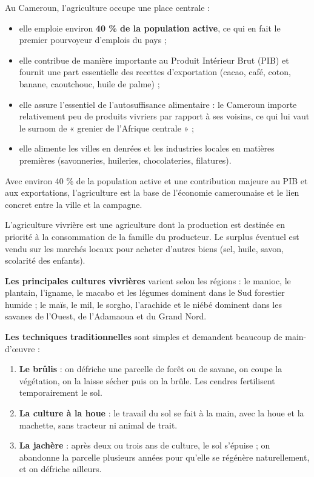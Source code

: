 \documentclass[11pt]{article}
\newcommand{\cle}[1]{{\popxbold\color{popdark}#1}}
\newcounter{popsec}
\newcounter{popsub}
\newcommand{\courssub}[1]{%
  \stepcounter{popsub}%
  \par\vspace{9pt}\noindent{\popxbold\fontsize{11.5}{13}\selectfont\color{popink}{\color{poporange}\thepopsec.\thepopsub}\hspace{6pt}#1}\par\nopagebreak\vspace{4pt}
}
\begin{document}
Au Cameroun, l'agriculture occupe une place centrale :

\begin{itemize}
\item elle emploie environ \textbf{40 \% de la population active}, ce qui en fait le premier pourvoyeur d'emplois du pays ;
\item elle contribue de manière importante au \cle{Produit Intérieur Brut} (PIB) et fournit une part essentielle des recettes d'exportation (cacao, café, coton, banane, caoutchouc, huile de palme) ;
\item elle assure l'essentiel de l'\cle{autosuffisance alimentaire} : le Cameroun importe relativement peu de produits vivriers par rapport à ses voisins, ce qui lui vaut le surnom de « grenier de l'Afrique centrale » ;
\item elle alimente les villes en denrées et les industries locales en matières premières (savonneries, huileries, chocolateries, filatures).
\end{itemize}

\begin{aretenir}
Avec environ 40 \% de la population active et une contribution majeure au PIB et aux exportations, l'agriculture est la base de l'économie camerounaise et le lien concret entre la ville et la campagne.
\end{aretenir}

\courssub{L'agriculture vivrière traditionnelle}

\begin{definition}
L'\cle{agriculture vivrière} est une agriculture dont la production est destinée en priorité à la consommation de la famille du producteur. Le surplus éventuel est vendu sur les marchés locaux pour acheter d'autres biens (sel, huile, savon, scolarité des enfants).
\end{definition}

\textbf{Les principales cultures vivrières} varient selon les régions : le \cle{manioc}, le \cle{plantain}, l'\cle{igname}, le \cle{macabo} et les légumes dominent dans le Sud forestier humide ; le \cle{maïs}, le \cle{mil}, le \cle{sorgho}, l'\cle{arachide} et le \cle{niébé} dominent dans les savanes de l'Ouest, de l'Adamaoua et du Grand Nord.

\textbf{Les techniques traditionnelles} sont simples et demandent beaucoup de main-d'œuvre :

\begin{enumerate}
\item \textbf{Le brûlis} : on défriche une parcelle de forêt ou de savane, on coupe la végétation, on la laisse sécher puis on la brûle. Les cendres fertilisent temporairement le sol.
\item \textbf{La culture à la houe} : le travail du sol se fait à la main, avec la houe et la machette, sans tracteur ni animal de trait.
\item \textbf{La jachère} : après deux ou trois ans de culture, le sol s'épuise ; on abandonne la parcelle plusieurs années pour qu'elle se régénère naturellement, et on défriche ailleurs.
\end{enumerate}
\end{document}
